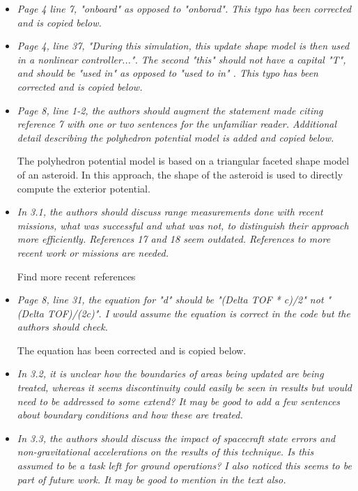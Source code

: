 \documentclass[11pt]{article}
\newcommand{\comment}[1]{\item \itshape #1 \normalfont}
\begin{document}
\begin{itemize}
\comment{
Page 4 line 7, "onboard" as opposed to "onborad".
}
This typo has been corrected and is copied below.

\comment{
Page 4, line 37, "During this simulation, this update shape model is then used in a nonlinear controller...". The second "this" should not have a capital "T", and should be "used in" as opposed to "used to in" .
}
This typo has been corrected and is copied below.

\comment{
Page 8, line 1-2, the authors should augment the statement made citing reference 7 with one or two sentences for the unfamiliar reader.  
}
Additional detail describing the polyhedron potential model is added and copied below.

The polyhedron potential model is based on a triangular faceted shape model of an asteroid.
In this approach, the shape of the asteroid is used to directly compute the exterior potential.

\comment{
In 3.1, the authors should discuss range measurements done with recent missions, what was successful and what was not, to distinguish their approach more efficiently. 
References 17 and 18 seem outdated. 
References to more recent work or missions are needed.
}

Find more recent references

\comment{
Page 8, line 31, the equation for "d" should be "(Delta TOF * c)/2" not "(Delta TOF)/(2c)". I would assume the equation is correct in the code but the authors should check.
}

The equation has been corrected and is copied below.


\comment{
In 3.2, it is unclear how the boundaries of areas being updated are being treated, whereas it seems discontinuity could easily be seen in results but would need to be addressed to some extend? It may be good to add a few sentences about boundary conditions and how these are treated.
}

\comment{
In 3.3, the authors should discuss the impact of spacecraft state errors and non-gravitational accelerations on the results of this technique. Is this assumed to be a task left for ground operations?
I also noticed this seems to be part of future work. It may be good to mention in the text also.
}


\end{itemize}
\end{document}
